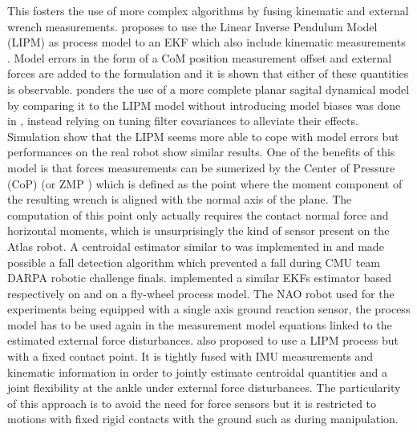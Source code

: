 This fosters the use of more complex algorithms by fusing kinematic and external wrench measurements. \cite{stephens2011state} proposes to use the 
Linear Inverse Pendulum Model (LIPM) as process model to an EKF which also include kinematic measurements . Model errors in the form of a CoM position measurement offset and external forces are added to the formulation and it is shown that
either of these quantities is observable. \cite{atkeson2012state} ponders the use of a more complete planar sagital dynamical model by comparing it to the LIPM model
without introducing model biases was done in \cite{stephens2011state}, instead relying on tuning filter covariances to alleviate their effects. 
Simulation show that the LIPM seems more able to cope with model errors but performances on the 
real robot show similar results. One of the benefits of this model is that forces measurements can be sumerized by the Center of Pressure (CoP) 
(or ZMP \cite{sardain2004forces}) which is defined as the point where the moment component of the resulting wrench is aligned with the normal axis of the plane.
The computation of this point only actually requires the contact normal force and horizontal moments, which is unsurprisingly  the kind of
sensor present on the Atlas robot. A centroidal estimator similar to \cite{stephens2011state} was implemented in \cite{xinjilefu2015center} and made possible
a fall detection algorithm which prevented a fall during CMU team DARPA robotic challenge finals. \cite{piperakis2016non, piperakis2018nonlinear} implemented a similar 
EKFs estimator based respectively on and on a fly-wheel process model. The NAO robot used for the experiments being equipped with a single axis ground reaction sensor,
the process model has to be used again in the measurement model equations linked to the estimated external force disturbances.   
\cite{benallegue2015estimation} also proposed to use a LIPM process but with a fixed contact point. It is tightly fused with IMU 
measurements and kinematic information in order to jointly estimate centroidal quantities 
and a joint flexibility at the ankle under external force disturbances. The particularity of this approach is to avoid the need for force sensors but
it is restricted to motions with fixed rigid contacts with the ground such as during manipulation.

